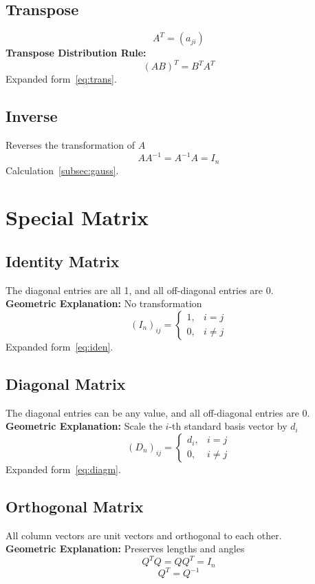 \documentclass{article}
\begin{document}
\subsection{Transpose}
\[
    A^T = (a_{ji})
\]
\textbf{Transpose Distribution Rule:}
\[
    (AB)^T = B^T A^T
\]
Expanded form~\ref{eq:trans}.

\subsection{Inverse}
Reverses the transformation of $A$
\[
    A A^{-1} = A^{-1} A = I_n
\]
Calculation~\ref{subsec:gauss}.


\newpage
\section{Special Matrix}

\subsection{Identity Matrix}
The diagonal entries are all 1, and all off-diagonal entries are 0.\\
\textbf{Geometric Explanation:} No transformation
\[
    (I_n)_{ij} =
    \begin{cases}
        1, & i = j \\
        0, & i \neq j
    \end{cases}
\]
Expanded form~\ref{eq:iden}.

\subsection{Diagonal Matrix}
The diagonal entries can be any value, and all off-diagonal entries are 0.\\
\textbf{Geometric Explanation:} Scale the $i$-th standard basis vector by $d_i$
\[
    (D_n)_{ij} =
    \begin{cases}
        d_i, & i = j \\
        0, & i \neq j
    \end{cases}
\]
Expanded form~\ref{eq:diagm}.

\subsection{Orthogonal Matrix}
All column vectors are unit vectors and orthogonal to each other.\\
\textbf{Geometric Explanation:} Preserves lengths and angles
\[
    Q^T Q = Q Q^T = I_n
\]
\[
    Q^T = Q^{-1}
\]
\end{document}
